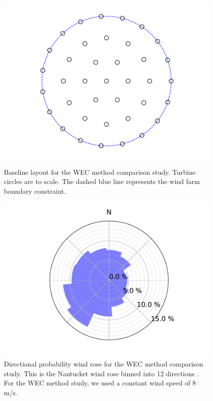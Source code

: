 \documentclass[a4paper]{jpconf}
\begin{document}
\begin{figure}[h!]
	\centering
	\begin{minipage}[t]{18pc}
		\centering
		\includegraphics[width=\textwidth, trim={1.5cm, 0cm, 2.0cm, 0cm}, clip]{final_images/layouts/38_turb_start.pdf}
		\caption{Baseline layout for the WEC method comparison study. Turbine circles are to scale. The dashed blue line represents the wind farm boundary constraint.}
		\label{fig:method_study_layout}
	\end{minipage}\hspace{1pc}%
	\begin{minipage}[t]{18pc}
		\centering
		\includegraphics[width=\textwidth, trim={2.0cm 0cm 1.5cm 0cm}, clip]{final_images/windroses/freqwindrose_12_dir.pdf}
		\caption{Directional probability wind rose for the WEC method comparison study. This is the Nantucket wind rose binned into 12 directions \cite{wrcc2017}. For the WEC method study, we used a constant wind speed of 8 m/s.}
		\label{fig:nantucket12dirs}
	\end{minipage} 
\end{figure}
\end{document}
